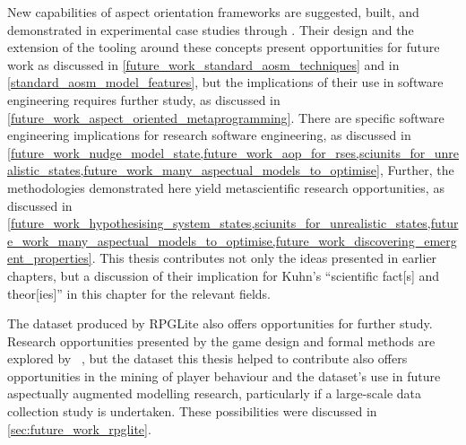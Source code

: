 New capabilities of aspect orientation frameworks are suggested, built, and
demonstrated in experimental case studies through \pdsf{}. Their design and the
extension of the tooling around these concepts present opportunities for future
work as discussed in \cref{future_work_standard_aosm_techniques} and in
\cref{standard_aosm_model_features}, but the implications of their use in
software engineering requires further study, as discussed in
\cref{future_work_aspect_oriented_metaprogramming}. There are specific software
engineering implications for research software engineering, as discussed in
\cref{future_work_nudge_model_state,future_work_aop_for_rses,sciunits_for_unrealistic_states,future_work_many_aspectual_models_to_optimise},
Further, the methodologies demonstrated here yield metascientific research
opportunities, as discussed in
\cref{future_work_hypothesising_system_states,sciunits_for_unrealistic_states,future_work_many_aspectual_models_to_optimise,future_work_discovering_emergent_properties}.
This thesis contributes not only the ideas presented in earlier chapters, but a
discussion of their implication for Kuhn's ``scientific fact[s] and theor[ies]''
in this chapter for the relevant fields.


The dataset produced by RPGLite also offers opportunities for further study.
Research opportunities presented by the game design and formal methods are
explored by \citeauthor{kavanagh2021thesis}~\cite{kavanagh2021thesis}, but the
dataset this thesis helped to contribute also offers opportunities in the
mining of player behaviour and the dataset's use in future aspectually
augmented modelling research, particularly if a large-scale data collection
study is undertaken. These possibilities were discussed in
\cref{sec:future_work_rpglite}.


